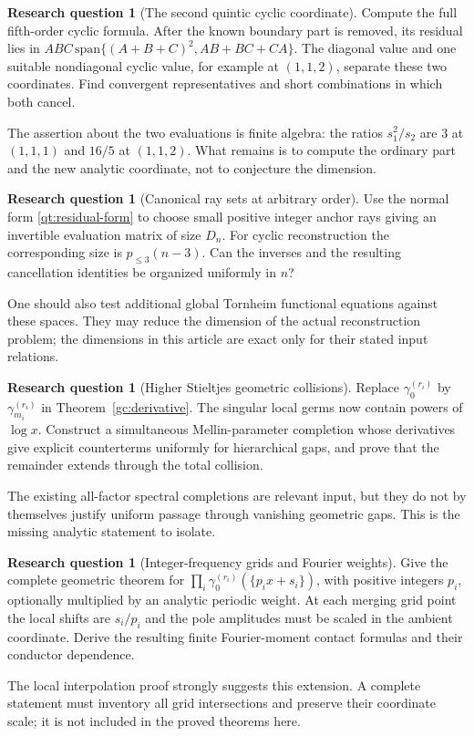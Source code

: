 \documentclass[11pt]{article}
\numberwithin{equation}{section}
\theoremstyle{definition}
\newtheorem{question}[theorem]{Research question}
\theoremstyle{remark}
\begin{document}
\begin{question}[The second quintic cyclic coordinate]
Compute the full fifth-order cyclic formula. After the known boundary
part is removed, its residual lies in
$ABC\,\mathrm{span}\{(A+B+C)^2,AB+BC+CA\}$.
The diagonal value and one suitable nondiagonal cyclic value, for example
at $(1,1,2)$, separate these two coordinates. Find convergent
representatives and short combinations in which both cancel.
\end{question}
The assertion about the two evaluations is finite algebra: the ratios
$s_1^2/s_2$ are $3$ at $(1,1,1)$ and $16/5$ at $(1,1,2)$.
What remains is to compute the ordinary part and the new analytic
coordinate, not to conjecture the dimension.

\begin{question}[Canonical ray sets at arbitrary order]
Use the normal form \eqref{qt:residual-form} to choose small positive
integer anchor rays giving an invertible evaluation matrix of size
$D_n$. For cyclic reconstruction the corresponding size is
$p_{\le3}(n-3)$. Can the inverses and the resulting cancellation
identities be organized uniformly in $n$?
\end{question}
One should also test additional global Tornheim functional equations
against these spaces. They may reduce the dimension of the actual
reconstruction problem; the dimensions in this article are exact only
for their stated input relations.

\begin{question}[Higher Stieltjes geometric collisions]
Replace $\gamma_0^{(r_i)}$ by $\gamma_{m_i}^{(r_i)}$ in
Theorem~\ref{gc:derivative}. The singular local germs now contain
powers of $\log x$. Construct a simultaneous Mellin-parameter
completion whose derivatives give explicit counterterms uniformly for
hierarchical gaps, and prove that the remainder extends through the
total collision.
\end{question}
The existing all-factor spectral completions are relevant input, but
they do not by themselves justify uniform passage through vanishing
geometric gaps. This is the missing analytic statement to isolate.

\begin{question}[Integer-frequency grids and Fourier weights]
Give the complete geometric theorem for
$\prod_i\gamma_0^{(r_i)}(\{p_i x+s_i\})$, with positive integers
$p_i$, optionally multiplied by an analytic periodic weight. At each
merging grid point the local shifts are $s_i/p_i$ and the pole amplitudes
must be scaled in the ambient coordinate. Derive the resulting finite
Fourier-moment contact formulas and their conductor dependence.
\end{question}
The local interpolation proof strongly suggests this extension. A
complete statement must inventory all grid intersections and preserve
their coordinate scale; it is not included in the proved theorems here.
\end{document}
